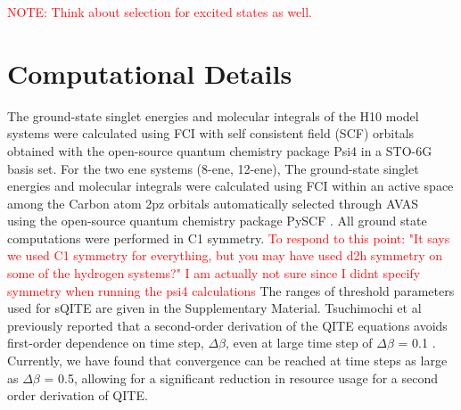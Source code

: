 \documentclass[aip,jcp,amsmath,amssymb, reprint]{revtex4-1}
\newcommand{\note}[2]{%
  \ifthenelse{\boolean{shownotes}}%
    {\textcolor{#1}{#2}}%
    {}%
}
\begin{document}

\note{red}{NOTE: Think about selection for excited states as well.}


\section{Computational Details}
The ground-state singlet energies and molecular integrals of the H10 model systems were calculated using FCI with self consistent field (SCF) orbitals obtained with the open-source quantum chemistry package Psi4 \cite{Parrish2017Psi4, smith2020psi4} in a STO-6G basis set. For the two ene systems (8-ene, 12-ene), The ground-state singlet energies and molecular integrals were calculated using FCI within an active space among the Carbon atom 2pz orbitals automatically selected through AVAS~\cite{sayfutyarova2017automated} using the open-source quantum chemistry package PySCF \cite{sun2018pyscf}. All ground state computations were performed in C1 symmetry. \note{red}{To respond to this point: "It says we used C1 symmetry for everything, but you may have used d2h symmetry on some of the hydrogen systems?" I am actually not sure since I didnt specify symmetry when running the psi4 calculations} The ranges of threshold parameters used for sQITE are given in the Supplementary Material. Tsuchimochi et al previously reported that a second-order derivation of the QITE equations avoids first-order dependence on time step, $\Delta\beta$, even at large time step of $\Delta\beta$ = 0.1 \cite{Tsuchimochi2023Improved}. Currently, we have found that convergence can be reached at time steps as large as $\Delta\beta$ = 0.5, allowing for a significant reduction in resource usage for a second order derivation of QITE. 
\end{document}
